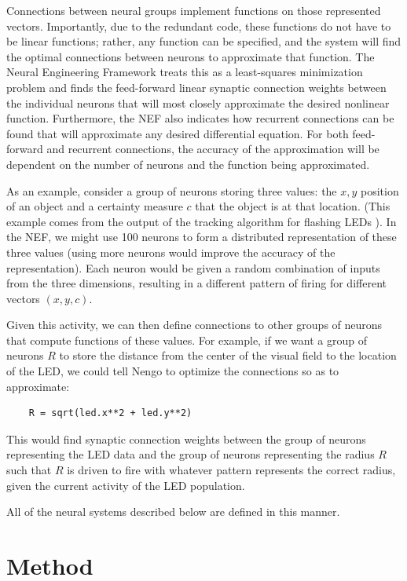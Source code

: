\documentclass[conference]{IEEEtran}
\begin{document}
Connections between neural 
groups implement functions on those represented vectors. Importantly, due to 
the redundant code, these functions do not have to be linear functions; 
rather, any function can be specified, and the system will find the optimal
connections between neurons to approximate that function. The Neural Engineering 
Framework treats this as a least-squares minimization problem and finds the 
feed-forward linear synaptic connection weights between the individual neurons that will 
most closely approximate the desired nonlinear function. Furthermore, the NEF 
also indicates how recurrent connections can be found that will approximate 
any desired differential equation.  For both feed-forward and recurrent 
connections, the accuracy of the approximation will be dependent on the 
number of neurons and the function being approximated. 

As an example, consider a group of neurons storing three values: the $x,y$ 
position of an object and a certainty measure $c$ that the object is at that
location.  (This example comes from the output of the tracking algorithm 
for flashing LEDs \cite{muller2011miniature}).  In the NEF, we might use 100 
neurons to form a distributed representation of these three values 
(using more neurons would improve the accuracy of the representation).  Each
neuron would be given a random combination of inputs from the three dimensions,
resulting in a different pattern of firing for different vectors $(x,y,c)$.

Given this activity, we can then define connections to other groups of neurons
that compute functions of these values. For example, if we want a group of 
neurons $R$ to store the distance from the center of the visual field to the 
location of the LED, we could tell Nengo to optimize the connections so
as to approximate: 
 
\begin{lstlisting}
    R = sqrt(led.x**2 + led.y**2)
\end{lstlisting}

This would find synaptic connection weights between the group of neurons 
representing the LED data and the group of neurons representing the 
radius $R$ such that $R$ is driven to fire with whatever pattern represents 
the correct radius, given the current activity of the LED population. 

All of the neural systems described below are defined in this manner.

\section{Method}
\end{document}
